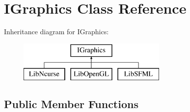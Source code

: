 \hypertarget{class_i_graphics}{}\section{I\+Graphics Class Reference}
\label{class_i_graphics}
Inheritance diagram for I\+Graphics\+:\begin{figure}[H]
\begin{center}
\leavevmode
\includegraphics[height=2.000000cm]{class_i_graphics}
\end{center}
\end{figure}
\subsection*{Public Member Functions}
